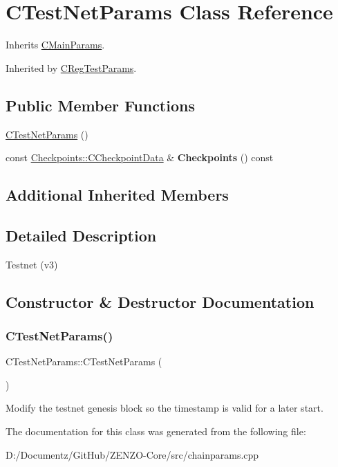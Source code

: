 \hypertarget{class_c_test_net_params}{}\section{C\+Test\+Net\+Params Class Reference}
\label{class_c_test_net_params}


Inherits \mbox{\hyperlink{class_c_main_params}{C\+Main\+Params}}.



Inherited by \mbox{\hyperlink{class_c_reg_test_params}{C\+Reg\+Test\+Params}}.

\subsection*{Public Member Functions}
\begin{DoxyCompactItemize}
\item 
\mbox{\hyperlink{class_c_test_net_params_abbd5f6e3e94bc8abf99a5dfaff75374a}{C\+Test\+Net\+Params}} ()
\item 
\mbox{\label{class_c_test_net_params_af19780caeb765b7d8b51cd1c0a109fa1}} 
const \mbox{\hyperlink{struct_checkpoints_1_1_c_checkpoint_data}{Checkpoints\+::\+C\+Checkpoint\+Data}} \& {\bfseries Checkpoints} () const
\end{DoxyCompactItemize}
\subsection*{Additional Inherited Members}


\subsection{Detailed Description}
Testnet (v3) 

\subsection{Constructor \& Destructor Documentation}
\mbox{\label{class_c_test_net_params_abbd5f6e3e94bc8abf99a5dfaff75374a}} 
\subsubsection{\texorpdfstring{CTestNetParams()}{CTestNetParams()}}
{\footnotesize\ttfamily C\+Test\+Net\+Params\+::\+C\+Test\+Net\+Params (\begin{DoxyParamCaption}{ }\end{DoxyParamCaption})\hspace{0.3cm}{\ttfamily [inline]}}

Modify the testnet genesis block so the timestamp is valid for a later start. 

The documentation for this class was generated from the following file\+:\begin{DoxyCompactItemize}
\item 
D\+:/\+Documentz/\+Git\+Hub/\+Z\+E\+N\+Z\+O-\/\+Core/src/chainparams.\+cpp\end{DoxyCompactItemize}
